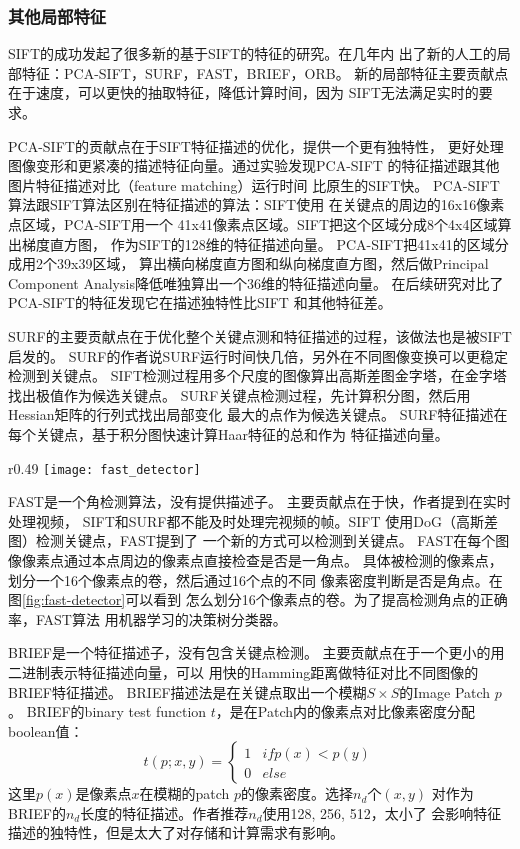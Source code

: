 \subsubsection{其他局部特征}
SIFT的成功发起了很多新的基于SIFT的特征的研究。在几年内
出了新的人工的局部特征：PCA-SIFT，SURF，FAST，BRIEF，ORB。
\cite{ke2004pca, bay2006surf, fast2006machine, calonder2010brief, rublee2011orb}
新的局部特征主要贡献点在于速度，可以更快的抽取特征，降低计算时间，因为
SIFT无法满足实时的要求。\cite{juan2009comparison, calonder2010brief}

PCA-SIFT的贡献点在于SIFT特征描述的优化，提供一个更有独特性，
更好处理图像变形和更紧凑的描述特征向量。通过实验发现PCA-SIFT
的特征描述跟其他图片特征描述对比（feature matching）运行时间
比原生的SIFT快。\cite{ke2004pca}
PCA-SIFT算法跟SIFT算法区别在特征描述的算法：SIFT使用
在关键点的周边的16x16像素点区域，PCA-SIFT用一个
41x41像素点区域。SIFT把这个区域分成8个4x4区域算出梯度直方图，
作为SIFT的128维的特征描述向量。
PCA-SIFT把41x41的区域分成用2个39x39区域，
算出横向梯度直方图和纵向梯度直方图，然后做Principal Component
Analysis降低唯独算出一个36维的特征描述向量。
在后续研究对比了PCA-SIFT的特征发现它在描述独特性比SIFT
和其他特征差。\cite{mikolajczyk2005performance}

SURF的主要贡献点在于优化整个关键点测和特征描述的过程，该做法也是被SIFT启发的。
SURF的作者说SURF运行时间快几倍，另外在不同图像变换可以更稳定检测到关键点。\cite{bay2006surf}
SIFT检测过程用多个尺度的图像算出高斯差图金字塔，在金字塔找出极值作为候选关键点。
SURF关键点检测过程，先计算积分图，然后用Hessian矩阵的行列式找出局部变化
最大的点作为候选关键点。
SURF特征描述在每个关键点，基于积分图快速计算Haar特征的总和作为
特征描述向量。

\clearpage
\begin{wrapfigure}{r}{0.49\textwidth}
  \centering
    \texttt{[image: fast\_detector]}
    \caption{FAST检测角点做法。\cite{fast2006machine}}
  \label{fig:fast-detector}
\end{wrapfigure}

FAST是一个角检测算法，没有提供描述子。
主要贡献点在于快，作者提到在实时处理视频，
SIFT和SURF都不能及时处理完视频的帧。SIFT
使用DoG（高斯差图）检测关键点，FAST提到了
一个新的方式可以检测到关键点。
FAST在每个图像像素点通过本点周边的像素点直接检查是否是一角点。
具体被检测的像素点，划分一个16个像素点的卷，然后通过16个点的不同
像素密度判断是否是角点。在图\ref{fig:fast-detector}可以看到
怎么划分16个像素点的卷。为了提高检测角点的正确率，FAST算法
用机器学习的决策树分类器。

BRIEF是一个特征描述子，没有包含关键点检测。\cite{calonder2010brief}
主要贡献点在于一个更小的用二进制表示特征描述向量，可以
用快的Hamming距离做特征对比不同图像的BRIEF特征描述。
BRIEF描述法是在关键点取出一个模糊$S \times S$的Image Patch $p$。
BRIEF的binary test function $t$，是在Patch内的像素点对比像素密度分配boolean值：
$$
t(p; x, y) = \begin{cases} 
      1 & if p(x) < p(y) \\
      0 & else 
 \end{cases}
$$
这里$p(x)$是像素点$x$在模糊的patch $p$的像素密度。选择$n_d$个$(x, y)$
对作为BRIEF的$n_d$长度的特征描述。作者推荐$n_d$使用128, 256, 512，太小了
会影响特征描述的独特性，但是太大了对存储和计算需求有影响。

